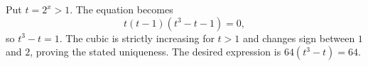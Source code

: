 Put $t=2^x>1$. The equation becomes
\[
t(t-1)(t^3-t-1)=0,
\]
so $t^3-t=1$. The cubic is strictly increasing for $t>1$ and changes sign between $1$ and $2$, proving the stated uniqueness. The desired expression is $64(t^3-t)=\boxed{64}$.
